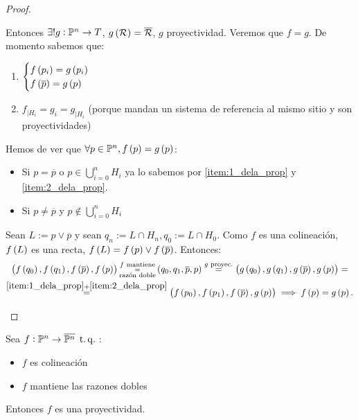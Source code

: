\begin{proof}
\begin{itemize}
        Entonces $\exists! g : \mathbb{P}^n \to T$, $g \left( \mathcal{R} \right) = \overline{\mathcal{R}}$, $g$ proyectividad. Veremos que $f = g$.
        De momento sabemos que:
        \begin{enumerate}[(1)]
            \item\label{item:1_dela_prop} $\begin{cases} f \left( p_i \right) = g \left( p_i \right) \\ f \left( \overline{p} \right) = g \left( p \right) \end{cases}$
            \item\label{item:2_dela_prop} $f_{|H_i} = g_i = g_{|H_i}$ (porque mandan un sistema de referencia al mismo sitio y son proyectividades)
        \end{enumerate}
        Hemos de ver que $\forall p \in \mathbb{P}^n, f \left( p \right) = g \left( p \right)$:
        \begin{itemize}
            \item Si $p = \overline{p}$ o $p \in \bigcup_{i=0}^n H_i$ ya lo sabemos por \eqref{item:1_dela_prop} y \eqref{item:2_dela_prop}.
            \item Si $p \neq \overline{p}$ y $p \notin \bigcup_{i=0}^n H_i$
        \end{itemize}
        Sean $L := p \vee \overline{p}$ y sean $q_n := L \cap H_n, q_0 := L \cap H_0$. Como $f$ es una colineación, $f \left( L \right)$ es una recta, $f \left( L \right) = f \left( p \right) \vee f \left( \overline{p} \right)$.
        Entonces:
        \begin{gather*}
            \left( f \left( q_0 \right), f \left( q_1 \right), f \left( \overline{p} \right), f \left( p \right) \right) \substack{f \text{ mantiene} \\ = \\ \text{razón doble}} \left( q_0, q_1, \overline{p}, p \right) \stackrel{g \text{ proyec.}}{=} \left( g \left( q_0 \right), g \left( q_1 \right), g \left( \overline{p} \right), g \left( p \right) \right) = \\
            \stackrel{\eqref{item:1_dela_prop} + \eqref{item:2_dela_prop}}{=} \left( f \left( p_0 \right), f \left( p_1 \right), f \left( \overline{p} \right), g \left( p \right) \right) \implies f \left( p \right) = g \left( p \right).
        \end{gather*}
    \end{itemize}
\end{proof}
\begin{teo*} \label{teo:proyectividades}
    Sea $f : \mathbb{P}^n \to \overline{\mathbb{P}^n} \operatorname{\;t.q.\;}$:
    \begin{itemize}
        \item $f$ es colineación
        \item $f$ mantiene las razones dobles
    \end{itemize}
    Entonces $f$ es una proyectividad.
\end{teo*}
